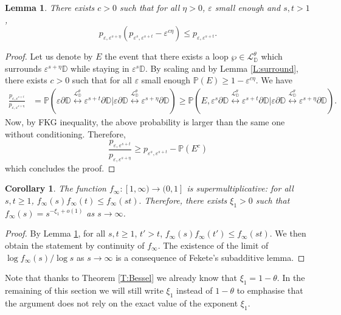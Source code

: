 \documentclass[11pt]{article}
\newtheorem{lemma}[theorem]{Lemma}
\newtheorem{corollary}[theorem]{Corollary}
\theoremstyle{remark}
\newcommand{\D}{\mathbb{D}}
\newcommand{\Lc}{\mathcal{L}}
\newcommand{\Prob}[1]{\mathbb{P} \left( #1 \right) }
\newcommand{\eps}{\varepsilon}
\numberwithin{equation}{section}
\begin{document}
\begin{lemma}\label{L:submultiplicativity}
There exists $c>0$ such that for all $\eta >0$, $\eps$ small enough and $s, t>1$,
\[
p_{\eps, \eps^{s + \eta}} ( p_{\eps^{s}, \eps^{s+t}} - \eps^{c\eta} )
\leq p_{\eps, \eps^{s + t}}.
\]
\end{lemma}

\begin{proof}
Let us denote by $E$ the event that there exists a loop $\wp \in \Lc_\D^\theta$ which surrounds $\eps^{s+\eta} \D$ while staying in $\eps^{s} \D$. By scaling and by Lemma \ref{L:surround}, there exists $c>0$ such that for all $\eps$ small enough $\Prob{E} \geq 1 - \eps^{c\eta}$.
We have
\begin{align*}
\frac{p_{\eps,\eps^{s+t}}}{p_{\eps, \eps^{s+\eta}}}
& = \Prob{ \eps \partial \D \overset{\Lc_\D^\theta}{\longleftrightarrow} \eps^{s+t} \partial \D \Big\vert \eps \partial \D \overset{\Lc_\D^\theta}{\longleftrightarrow} \eps^{s+\eta} \partial \D } \geq \Prob{ E, \eps^{s} \partial \D \overset{\Lc_\D^\theta}{\longleftrightarrow} \eps^{s+t} \partial \D \Big\vert \eps \partial \D \overset{\Lc_\D^\theta}{\longleftrightarrow} \eps^{s+\eta} \partial \D }.
\end{align*}
Now, by FKG inequality, the above probability is larger than the same one without conditioning. Therefore,
\[
\frac{p_{\eps,\eps^{s+t}}}{p_{\eps, \eps^{s+\eta}}} \geq p_{\eps^{s}, \eps^{s+t}} - \Prob{E^c}
\]
which concludes the proof.
\end{proof}

\begin{corollary}\label{C:submultiplicative}
The function $f_\infty :[1,\infty) \to (0,1]$ is supermultiplicative: for all $s, t \geq 1$,
$
f_\infty(s)f_\infty(t) \leq f_\infty(st).
$
Therefore, there exists $\xi_1 >0$ such that
$
f_\infty(s) = s^{-{\xi_1} + o(1)}
$
as $s \to \infty$.
\end{corollary}

\begin{proof}
By Lemma \ref{L:submultiplicativity}, for all $s, t \geq 1$, $t'>t$,
$
f_\infty(s) f_\infty(t') \leq f_\infty(s t).
$
We then obtain the statement by continuity of $f_\infty$.
The existence of the limit of
$
\log f_\infty(s) / \log s
$
as $s \to \infty$
is a consequence of Fekete's subadditive lemma.
\end{proof}

Note that thanks to Theorem \ref{T:Bessel} we already know that $\xi_1 = 1-\theta$. In the remaining of this section we will still write $\xi_1$ instead of $1-\theta$ to emphasise that the argument does not rely on the exact value of the exponent $\xi_1$.
\end{document}
